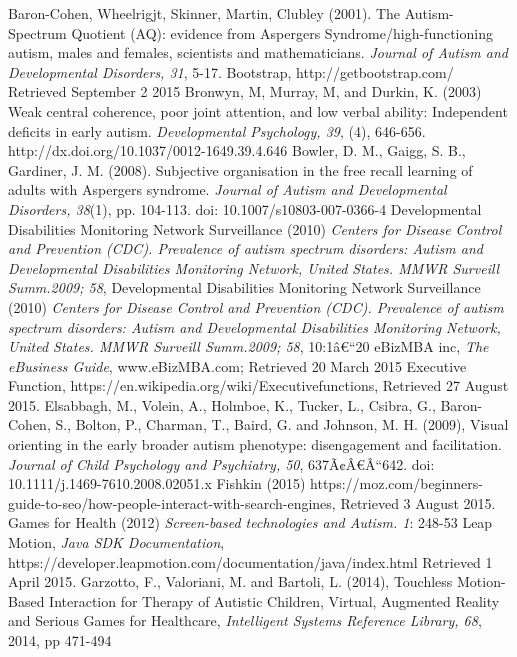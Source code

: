 \documentclass[a4paper, 11pt]{article}
\begin{document}
\begin{thebibliography}{100}
 Baron-Cohen, Wheelrigjt, Skinner, Martin, Clubley (2001).  The Autism-Spectrum Quotient (AQ): evidence from Aspergers Syndrome/high-functioning autism, males and females, scientists and mathematicians.  \textit{Journal of Autism and Developmental Disorders, 31}, 5-17.
Bootstrap, http://getbootstrap.com/ Retrieved September 2 2015
 Bronwyn, M, Murray, M, and Durkin, K. (2003) Weak central coherence, poor joint attention, and low verbal ability: Independent deficits in early autism. \textit{Developmental Psychology, 39}, (4), 646-656. http://dx.doi.org/10.1037/0012-1649.39.4.646
 Bowler, D. M., Gaigg, S. B., Gardiner, J. M. (2008). Subjective organisation in the free recall learning of adults with Aspergers syndrome. \textit{Journal of Autism and Developmental Disorders, 38}(1), pp. 104-113. doi: 10.1007/s10803-007-0366-4 
Developmental Disabilities Monitoring Network Surveillance (2010) \textit{Centers for Disease Control and Prevention (CDC). Prevalence of autism spectrum disorders: Autism and Developmental Disabilities Monitoring Network, United States. MMWR Surveill Summ.2009; 58},
Developmental Disabilities Monitoring Network Surveillance (2010) \textit{Centers for Disease Control and Prevention (CDC). Prevalence of autism spectrum disorders: Autism and Developmental Disabilities Monitoring Network, United States. MMWR Surveill Summ.2009; 58}, 10:1â€“20
eBizMBA inc, \textit{The eBusiness Guide}, www.eBizMBA.com; Retrieved 20 March 2015
 Executive Function, https://en.wikipedia.org/wiki/Executivefunctions, Retrieved 27 August 2015.
Elsabbagh, M., Volein, A., Holmboe, K., Tucker, L., Csibra, G., Baron-Cohen, S., Bolton, P., Charman, T., Baird, G. and Johnson, M. H. (2009), Visual orienting in the early broader autism phenotype: disengagement and facilitation. \textit{Journal of Child Psychology and Psychiatry, 50}, 637Ã¢Â€Â“642. doi: 10.1111/j.1469-7610.2008.02051.x
 Fishkin (2015) https://moz.com/beginners-guide-to-seo/how-people-interact-with-search-engines, Retrieved 3 August 2015.
 Games for Health (2012) \textit{Screen-based technologies and Autism. 1}: 248-53
 Leap Motion, \textit{Java SDK Documentation}, \\https://developer.leapmotion.com/documentation/java/index.html Retrieved 1 April 2015.
 Garzotto, F., Valoriani, M. and Bartoli, L. (2014), Touchless Motion-Based Interaction for Therapy of Autistic Children, Virtual, Augmented Reality and Serious Games for Healthcare, \textit{Intelligent Systems Reference Library, 68}, 2014, pp 471-494

\end{thebibliography}
\end{document}

